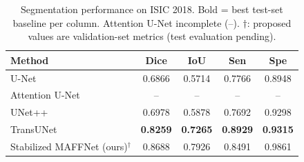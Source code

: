 \begin{table}[t]
\centering
\caption{Segmentation performance on ISIC 2018. Bold = best test-set baseline per
column. Attention U-Net incomplete (--). $\dagger$: proposed values are
validation-set metrics (test evaluation pending).}
\label{tab:isic2018}
\begin{tabular}{lcccc}
\toprule
Method & Dice & IoU & Sen & Spe \\
\midrule
U-Net           & 0.6866 & 0.5714 & 0.7766 & 0.8948 \\
Attention U-Net & -- & -- & -- & -- \\
UNet++          & 0.6978 & 0.5878 & 0.7692 & 0.9298 \\
TransUNet       & \textbf{0.8259} & \textbf{0.7265} & \textbf{0.8929} & \textbf{0.9315} \\
Stabilized MAFFNet (ours)$^{\dagger}$ & 0.8688 & 0.7926 & 0.8491 & 0.9861 \\
\bottomrule
\end{tabular}
\end{table}
